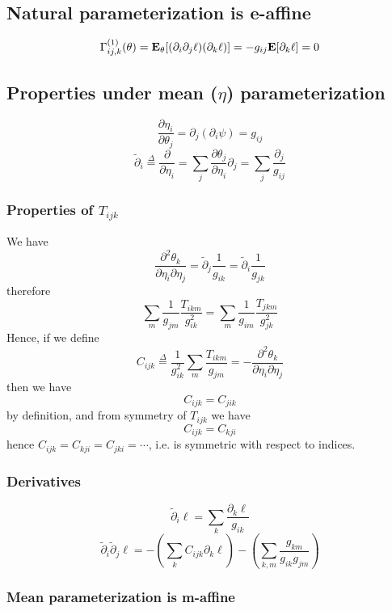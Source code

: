 \documentclass[11pt]{article}
\begin{document}
\subsection{Natural parameterization is e-affine}

\[
\Gamma^{(1)}_{ij, k}(\theta) = \textbf{E}_\theta[(\partial_i \partial_j \ell)(\partial_k \ell)] = -g_{ij} \textbf{E}[\partial_k \ell] = 0
\]

\subsection{Properties under mean ($\eta$) parameterization}


\[
\frac{\partial \eta_i}{\partial \theta_j} = \partial_j (\partial_i \psi) = g_{ij}
\]
\[
\tilde{\partial}_i \stackrel{\Delta}{=} \frac{\partial}{\partial \eta_i} = \sum_j \frac{\partial \theta_j}{\partial \eta_i} \partial_j = \sum_j \frac{\partial_j}{g_{ij}}
\]

\subsubsection{Properties of $T_{ijk}$}

We have
\[
\frac{\partial^2 \theta_k}{\partial \eta_i \partial \eta_j} = \tilde{\partial}_j \frac{1}{g_{ik}} = \tilde{\partial}_i \frac{1}{g_{jk}}
\]
therefore
\[
\sum_m \frac{1}{g_{jm}} \frac{T_{ikm}}{g_{ik}^2} = \sum_m \frac{1}{g_{im}} \frac{T_{jkm}}{g_{jk}^2}
\]
Hence, if we define
\[
C_{ijk} \stackrel{\Delta}{=} \frac{1}{g_{ik}^2} \sum_m \frac{T_{ikm}}{g_{jm}} = -\frac{\partial^2 \theta_k}{\partial \eta_i \partial \eta_j}
\]
then we have
\[
C_{ijk} = C_{jik}
\]
by definition, and from symmetry of $T_{ijk}$ we have
\[
C_{ijk} = C_{kji}
\]
hence $C_{ijk} = C_{kji} = C_{jki} = \cdots$, i.e. is symmetric with respect to indices.

\subsubsection{Derivatives}

\[
\tilde{\partial}_i \ell = \sum_k \frac{\partial_k \ell}{g_{ik}}
\]
\[
\tilde{\partial}_i \tilde{\partial}_j \ell = -\left(\sum_k C_{ijk} \partial_k \ell \right) - \left(\sum_{k,m} \frac{g_{km}}{g_{ik}g_{jm}}\right)
\]

\subsubsection{Mean parameterization is m-affine}
\end{document}
